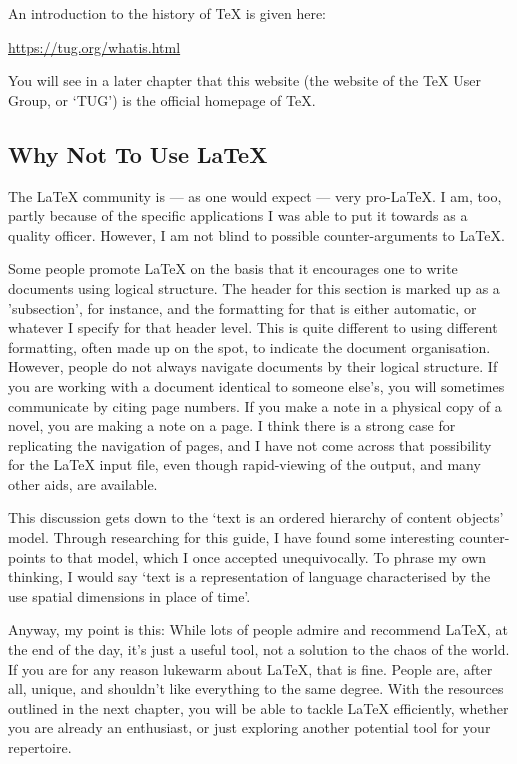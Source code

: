 \documentclass[11pt, oneside]{memoir}
\begin{document}
An introduction to the history of TeX is given here:

\url{https://tug.org/whatis.html}

You will see in a later chapter that this website (the website of the TeX User Group, or `TUG') is the official homepage of TeX.

\subsection{Why Not To Use LaTeX}
The LaTeX community is — as one would expect — very pro-LaTeX. I am, too, partly because of the specific applications I was able to put it towards as a quality officer. However, I am not blind to possible counter-arguments to LaTeX.

Some people promote LaTeX on the basis that it encourages one to write documents using logical structure. The header for this section is marked up as a 'subsection', for instance, and the formatting for that is either automatic, or whatever I specify for that header level. This is quite different to using different formatting, often made up on the spot, to indicate the document organisation. However, people do not always navigate documents by their logical structure. If you are working with a document identical to someone else's, you will sometimes communicate by citing page numbers. If you make a note in a physical copy of a novel, you are making a note on a page. I think there is a strong case for replicating the navigation of pages, and I have not come across that possibility for the LaTeX input file, even though rapid-viewing of the output, and many other aids, are available.

This discussion gets down to the `text is an ordered hierarchy of content objects' model. Through researching for this guide, I have found some interesting counter-points to that model, which I once accepted unequivocally. To phrase my own thinking, I would say `text is a representation of language characterised by the use spatial dimensions in place of time'.

Anyway, my point is this: While lots of people admire and recommend LaTeX, at the end of the day, it's just a useful tool, not a solution to the chaos of the world. If you are for any reason lukewarm about LaTeX, that is fine. People are, after all, unique, and shouldn't like everything to the same degree. With the resources outlined in the next chapter, you will be able to tackle LaTeX efficiently, whether you are already an enthusiast, or just exploring another potential tool for your repertoire.
\end{document}
